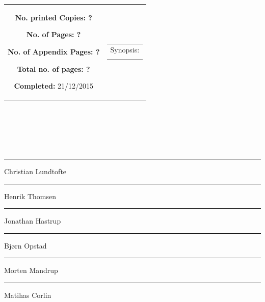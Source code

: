 {\begin{tabular}{cc}
{	\begin{description}
		\item { \textbf{No. printed Copies: ?} }
		\item { \textbf{No. of Pages: ?} } 
		\item { \textbf{No. of Appendix Pages: ?} }
		\item { \textbf{Total no. of pages: ?} } 
		\item { \textbf{Completed:} 21/12/2015}
	\end{description}
	\vfill } &
	\parbox{7cm}{
 	 \vspace{.15cm}
  	\hfill 
  	\begin{tabular}{l}
  		{ Synopsis:}\bigskip \\
  		\fbox{
  		\parbox{6.5cm}{\bigskip
     		{\vfill{\small 
     		\bigskip}}
     	}}
   	\end{tabular}}
\end{tabular}
}%
\\
\vfill
{}

\null\vfill
\begin{center}\hspace*{\fill} \\[4cm]
\begin{minipage}{0.4\textwidth}
\begin{flushleft} \large
$ $ \\[2.5cm]
{\rule{\linewidth}{0.5mm}}
Christian Lundtofte\\[2cm]
{\rule{\linewidth}{0.5mm}}
Henrik Thomsen\\[2cm]
{\rule{\linewidth}{0.5mm}}
Jonathan Hastrup\\[2cm]
\end{flushleft}
\end{minipage}
\begin{minipage}{0.4\textwidth}
\begin{flushright} \large
{\rule{\linewidth}{0.5mm}}
Bjørn Opstad\\[2cm]
{\rule{\linewidth}{0.5mm}}
Morten Mandrup\\[2cm]
{\rule{\linewidth}{0.5mm}}
Matihas Corlin\\[2cm]
\end{flushright}
\end{minipage}

\end{center}
\vfill\clearpage

%